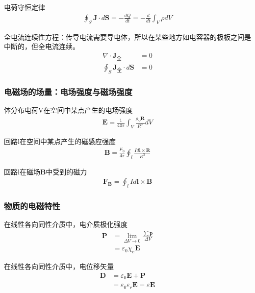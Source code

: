 \documentclass[withoutpreface,bwprint]{cumcmthesis} %
\begin{document}
电荷守恒定律
\begin{align}
    \oint_S \boldsymbol{J}\cdot d\boldsymbol{S} = -\frac{dQ}{dt} = -\frac{d}{dt}\int_V \rho dV
\end{align}

全电流连续性方程：传导电流需要导电体，所以在某些地方如电容器的极板之间是中断的，但全电流连续。
\begin{align}
    \nabla \cdot \boldsymbol{J_{\mbox{全}}} &= 0\\
    \oint_S \boldsymbol{J_{\mbox{全}}}\cdot d\boldsymbol{S} &= 0
\end{align}

\subsubsection{电磁场的场量：电场强度与磁场强度}

体分布电荷V在空间中某点产生的电场强度
\begin{align}
    \boldsymbol{E} = \frac{1}{4\pi \varepsilon}\int_V \frac{\rho_V \boldsymbol{R}}{R^3} dV
\end{align}

回路l在空间中某点产生的磁感应强度
\begin{align}
    \boldsymbol{B} = \frac{\mu_0}{4\pi}\oint_l \frac{Id\boldsymbol{l}\times \boldsymbol{R}}{R^3}
\end{align}

回路l在磁场$\boldsymbol{B}$中受到的磁力
\begin{align}
    \boldsymbol{F_B} = \oint_l Id\boldsymbol{l}\times \boldsymbol{B}
\end{align}

\subsubsection{物质的电磁特性}

在线性各向同性介质中，电介质极化强度
\begin{align}
    \boldsymbol{P} &= \lim_{\Delta V \to 0}\frac{\sum \boldsymbol{p}}{\Delta V} \\
    &= \varepsilon_0 \chi_e \boldsymbol{E}
\end{align}

在线性各向同性介质中，电位移矢量
\begin{align}
    \boldsymbol{D} &= \varepsilon_0 \boldsymbol{E} + \boldsymbol{P} \\
    &= \varepsilon_0 \varepsilon_r \boldsymbol{E} = \varepsilon\boldsymbol{E}
\end{align}
\end{document}
